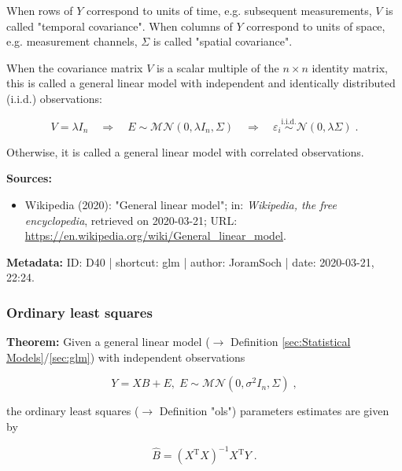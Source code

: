 \documentclass[a4paper,12pt,twoside]{book}
\begin{document}
When rows of $Y$ correspond to units of time, e.g. subsequent measurements, $V$ is called "temporal covariance". When columns of $Y$ correspond to units of space, e.g. measurement channels, $\Sigma$ is called "spatial covariance".

When the covariance matrix $V$ is a scalar multiple of the $n \times n$ identity matrix, this is called a general linear model with independent and identically distributed (i.i.d.) observations:

\begin{equation} \label{eq:glm-glm-iid}
V = \lambda I_n \quad \Rightarrow \quad E \sim \mathcal{MN}(0, \lambda I_n, \Sigma) \quad \Rightarrow \quad \varepsilon_i \overset{\text{i.i.d.}}{\sim} \mathcal{N}(0, \lambda \Sigma) \; .
\end{equation}

Otherwise, it is called a general linear model with correlated observations.


\vspace{1em}
\textbf{Sources:}
\begin{itemize}
\item Wikipedia (2020): "General linear model"; in: \textit{Wikipedia, the free encyclopedia}, retrieved on 2020-03-21; URL: \url{https://en.wikipedia.org/wiki/General_linear_model}.
\end{itemize}


\vspace{1em}
\textbf{Metadata:} ID: D40 | shortcut: glm | author: JoramSoch | date: 2020-03-21, 22:24.
\vspace{1em}



\subsubsection[\textbf{Ordinary least squares}]{Ordinary least squares} \label{sec:glm-ols}
\setcounter{equation}{0}

\textbf{Theorem:} Given a general linear model ($\rightarrow$ Definition \ref{sec:Statistical Models}/\ref{sec:glm}) with independent observations

\begin{equation} \label{eq:glm-ols-GLM}
Y = X B + E, \; E \sim \mathcal{MN}(0, \sigma^2 I_n, \Sigma) \; ,
\end{equation}

the ordinary least squares ($\rightarrow$ Definition "ols") parameters estimates are given by

\begin{equation} \label{eq:glm-ols-OLS}
\hat{B} = (X^\mathrm{T} X)^{-1} X^\mathrm{T} Y \; .
\end{equation}
\end{document}
